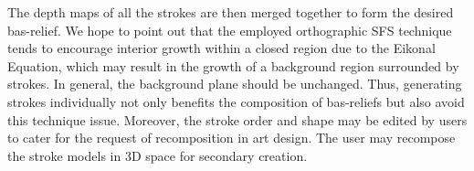 \newline
The depth maps of all the strokes are then merged together to form the desired bas-relief. We hope to point out that the employed orthographic SFS technique tends to encourage interior growth within a closed region due to the Eikonal Equation, which may result in the growth of a background region surrounded by strokes. In general, the background plane should be unchanged. Thus, generating strokes individually not only benefits the composition of bas-reliefs but also avoid this technique issue.
Moreover, the stroke order and shape may be edited by users to cater for the request of recomposition in art design. The user may recompose the stroke models in 3D space for secondary creation.
\newpage 
